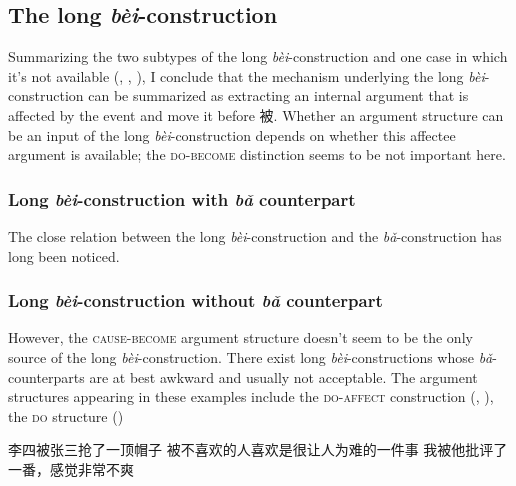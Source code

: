 \documentclass[UTF8, a4paper, oneside, scheme=plain, 12pt]{ctexrep}
\newcommand{\form}[1]{\emph{#1}}
\newcommand*{\category}[1]{\textsc{#1}}
\begin{document}
\subsection{The long \form{bèi}-construction}\label{sec:verb-phrase.bei}

Summarizing the two subtypes of the long \form{bèi}-construction
and one case in which it's not available
(,
,
),
I conclude that the mechanism underlying the long \form{bèi}-construction
can be summarized as 
extracting an internal argument that is affected by the event 
and move it before 被.
Whether an argument structure can be an input of the long \form{bèi}-construction
depends on whether this affectee argument is available;
the \category{do}-\category{become} distinction seems to be not important here.

\subsubsection{Long \form{bèi}-construction with \form{bǎ} counterpart}
\label{sec:verb-phrase.bei.ba}

The close relation between the long \form{bèi}-construction 
and the \form{bǎ}-construction
has long been noticed.

\subsubsection{Long \form{bèi}-construction without \form{bǎ} counterpart}
\label{sec:verb-phrase.bei.no-ba}

However, the \category{cause}-\category{become} argument structure
doesn't seem to be the only source of the long \form{bèi}-construction.
There exist long \form{bèi}-constructions whose \form{bǎ}-counterparts 
are at best awkward and usually not acceptable.
The argument structures appearing in these examples 
include the \category{do}-\category{affect} construction 
(, 
),
the \category{do} structure 
()

\begin{exe}
    \ex\label{ex:verb-phrase.long-bei.no-ba.1} 李四被张三抢了一顶帽子
    \ex\label{ex:verb-phrase.long-bei.no-ba.2} 被不喜欢的人喜欢是很让人为难的一件事
    \ex 我被他批评了一番，感觉非常不爽
\end{exe}
\end{document}
